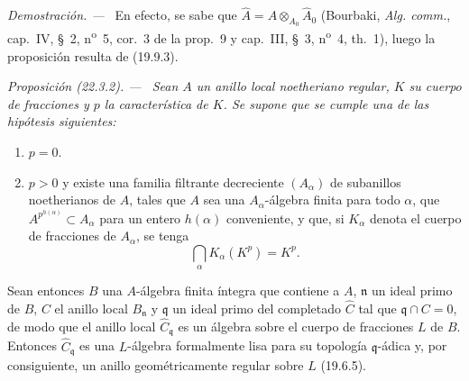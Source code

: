 \documentclass[10pt,oneside]{book}
\makeatletter
\newcommand{\setmanualcurrentlabel}[1]{\def\@currentlabel{#1}}
\newenvironment{proposition}[1][]{%
  \setmanualcurrentlabel{#1}\par\medskip\noindent\itshape Proposición (#1). ---\ }{\par}
\newenvironment{proof}{%
  \par\medskip\noindent\textit{Demostración. ---\ }}{\par}
\makeatother
\begin{document}
\begin{proof}
En efecto, se sabe que
$\widehat A=A\otimes_{A_0}\widehat A_0$ (Bourbaki,
\emph{Alg. comm.}, cap.~IV, §~2, n\textsuperscript{o}~5, cor.~3 de la
prop.~9 y cap.~III, §~3, n\textsuperscript{o}~4, th.~1), luego la proposición
resulta de (19.9.3).
\end{proof}

\begin{proposition}[22.3.2]
\label{0.22.3.2-es}
Sean $A$ un anillo local noetheriano regular, $K$ su cuerpo de fracciones y
$p$ la característica de $K$. Se supone que se cumple una de las hipótesis
siguientes:
\begin{enumerate}
  \item[\textup{(i)}] $p=0$.
  \item[\textup{(ii)}] $p>0$ y existe una familia filtrante decreciente $(A_\alpha)$
  de subanillos noetherianos de $A$, tales que $A$ sea una
  $A_\alpha$-álgebra finita para todo $\alpha$, que
  $A^{p^{h(\alpha)}}\subset A_\alpha$ para un entero $h(\alpha)$ conveniente,
  y que, si $K_\alpha$ denota el cuerpo de fracciones de $A_\alpha$, se tenga
  \[
    \bigcap_\alpha K_\alpha(K^p)=K^p.
  \]
\end{enumerate}
Sean entonces $B$ una $A$-álgebra finita íntegra que contiene a $A$,
$\mathfrak n$ un ideal primo de $B$, $C$ el anillo local $B_\mathfrak n$ y
$\mathfrak q$ un ideal primo del completado $\widehat C$ tal que
$\mathfrak q\cap C=0$, de modo que el anillo local
$\widehat C_\mathfrak q$ es un álgebra sobre el cuerpo de fracciones $L$ de
$B$. Entonces $\widehat C_\mathfrak q$ es una $L$-álgebra formalmente lisa
para su topología $\mathfrak q$-ádica y, por consiguiente, un anillo
geométricamente regular sobre $L$ \textup{(19.6.5)}.
\end{proposition}
\end{document}
